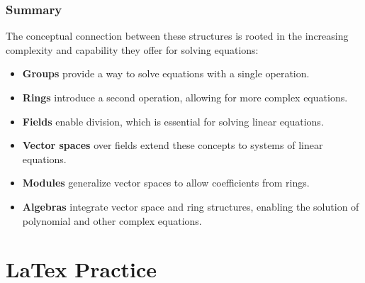 \documentclass[12pt,openany]{book}
\begin{document}
	\subsection*{Summary}
	The conceptual connection between these structures is rooted in the increasing complexity and capability they offer for solving equations:
	\begin{itemize}
		\item \textbf{Groups} provide a way to solve equations with a single operation.
		\item \textbf{Rings} introduce a second operation, allowing for more complex equations.
		\item \textbf{Fields} enable division, which is essential for solving linear equations.
		\item \textbf{Vector spaces} over fields extend these concepts to systems of linear equations.
		\item \textbf{Modules} generalize vector spaces to allow coefficients from rings.
		\item \textbf{Algebras} integrate vector space and ring structures, enabling the solution of polynomial and other complex equations.
	\end{itemize}
	
	\newpage
	\chapter*{LaTex Practice}
	
	
	\newpage
	\appendix
	
	
\end{document}
